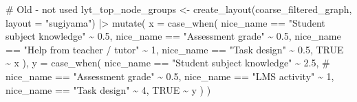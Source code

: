 \documentclass[
  letterpaper,
  DIV=11,
  numbers=noendperiod]{scrartcl}
\newenvironment{Shaded}{\begin{snugshade}}{\end{snugshade}}
\newcommand{\AttributeTok}[1]{\textcolor[rgb]{0.40,0.45,0.13}{#1}}
\newcommand{\CommentTok}[1]{\textcolor[rgb]{0.37,0.37,0.37}{#1}}
\newcommand{\ConstantTok}[1]{\textcolor[rgb]{0.56,0.35,0.01}{#1}}
\newcommand{\DecValTok}[1]{\textcolor[rgb]{0.68,0.00,0.00}{#1}}
\newcommand{\FloatTok}[1]{\textcolor[rgb]{0.68,0.00,0.00}{#1}}
\newcommand{\FunctionTok}[1]{\textcolor[rgb]{0.28,0.35,0.67}{#1}}
\newcommand{\NormalTok}[1]{\textcolor[rgb]{0.00,0.23,0.31}{#1}}
\newcommand{\OtherTok}[1]{\textcolor[rgb]{0.00,0.23,0.31}{#1}}
\newcommand{\SpecialCharTok}[1]{\textcolor[rgb]{0.37,0.37,0.37}{#1}}
\newcommand{\StringTok}[1]{\textcolor[rgb]{0.13,0.47,0.30}{#1}}
\begin{document}
\begin{Shaded}
\begin{Highlighting}[]
\CommentTok{\# Old {-} not used}
\NormalTok{lyt\_top\_node\_groups }\OtherTok{\textless{}{-}} \FunctionTok{create\_layout}\NormalTok{(coarse\_filtered\_graph, }\AttributeTok{layout =} \StringTok{"sugiyama"}\NormalTok{) }\SpecialCharTok{|\textgreater{}} 
    \FunctionTok{mutate}\NormalTok{(}
        \AttributeTok{x =} \FunctionTok{case\_when}\NormalTok{(}
\NormalTok{            nice\_name }\SpecialCharTok{==} \StringTok{"Student subject knowledge"} \SpecialCharTok{\textasciitilde{}} \FloatTok{0.5}\NormalTok{,}
\NormalTok{            nice\_name }\SpecialCharTok{==} \StringTok{"Assessment grade"} \SpecialCharTok{\textasciitilde{}} \FloatTok{0.5}\NormalTok{,}
\NormalTok{            nice\_name }\SpecialCharTok{==} \StringTok{"Help from teacher / tutor"} \SpecialCharTok{\textasciitilde{}} \DecValTok{1}\NormalTok{,}
\NormalTok{            nice\_name }\SpecialCharTok{==} \StringTok{"Task design"} \SpecialCharTok{\textasciitilde{}} \FloatTok{0.5}\NormalTok{,}
            \ConstantTok{TRUE} \SpecialCharTok{\textasciitilde{}}\NormalTok{ x}
\NormalTok{        ),}
        \AttributeTok{y =} \FunctionTok{case\_when}\NormalTok{(}
\NormalTok{            nice\_name }\SpecialCharTok{==} \StringTok{"Student subject knowledge"} \SpecialCharTok{\textasciitilde{}} \FloatTok{2.5}\NormalTok{,}
            \CommentTok{\# nice\_name == "Assessment grade" \textasciitilde{} 0.5,}
\NormalTok{            nice\_name }\SpecialCharTok{==} \StringTok{"LMS activity"} \SpecialCharTok{\textasciitilde{}} \DecValTok{1}\NormalTok{,}
\NormalTok{            nice\_name }\SpecialCharTok{==} \StringTok{"Task design"} \SpecialCharTok{\textasciitilde{}} \DecValTok{4}\NormalTok{,}
            \ConstantTok{TRUE} \SpecialCharTok{\textasciitilde{}}\NormalTok{ y}
\NormalTok{        )}
\NormalTok{    )}


\end{Highlighting}
\end{Shaded}
\end{document}
